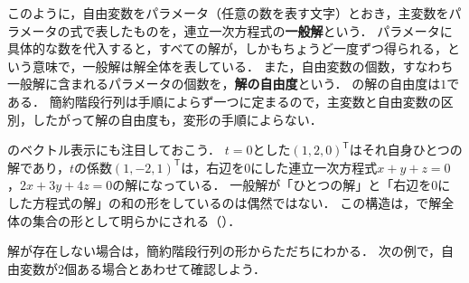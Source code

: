 このように，自由変数をパラメータ（任意の数を表す文字）とおき，主変数をパラメータの式で表したものを，連立一次方程式の\textbf{一般解}という．
パラメータに具体的な数を代入すると，すべての解が，しかもちょうど一度ずつ得られる，という意味で，一般解は解全体を表している．
また，自由変数の個数，すなわち一般解に含まれるパラメータの個数を，\textbf{解の自由度}という．
の解の自由度は$1$である．
簡約階段行列は手順によらず一つに定まるので，主変数と自由変数の区別，したがって解の自由度も，変形の手順によらない．

のベクトル表示にも注目しておこう．
$t = 0$とした$(1, 2, 0)^\mathsf{T}$はそれ自身ひとつの解であり，$t$の係数$(1, -2, 1)^\mathsf{T}$は，右辺を$0$にした連立一次方程式$x + y + z = 0$，$2x + 3y + 4z = 0$の解になっている．
一般解が「ひとつの解」と「右辺を$0$にした方程式の解」の和の形をしているのは偶然ではない．
この構造は，で解全体の集合の形として明らかにされる（）．

解が存在しない場合は，簡約階段行列の形からただちにわかる．
次の例で，自由変数が$2$個ある場合とあわせて確認しよう．

